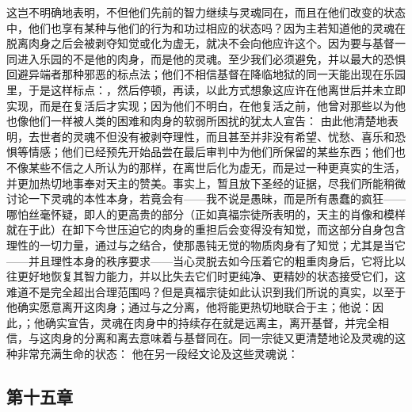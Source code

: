 这岂不明确地表明，不但他们先前的智力继续与灵魂同在，而且在他们改变的状态中，他们也享有某种与他们的行为和功过相应的状态吗？因为主若知道他的灵魂在脱离肉身之后会被剥夺知觉或化为虚无，就决不会向他应许这个。因为要与基督一同进入乐园的不是他的肉身，而是他的灵魂。至少我们必须避免，并以最大的恐惧回避异端者那种邪恶的标点法；他们不相信基督在降临地狱的同一天能出现在乐园里，于是这样标点：，然后停顿，再读，以此方式想象这应许在他离世后并未立即实现，而是在复活后才实现；因为他们不明白，在他复活之前，他曾对那些以为他也像他们一样被人类的困难和肉身的软弱所困扰的犹太人宣告：  由此他清楚地表明，去世者的灵魂不但没有被剥夺理性，而且甚至并非没有希望、忧愁、喜乐和恐惧等情感；他们已经预先开始品尝在最后审判中为他们所保留的某些东西；他们也不像某些不信之人所认为的那样，在离世后化为虚无，而是过一种更真实的生活，并更加热切地事奉对天主的赞美。事实上，暂且放下圣经的证据，尽我们所能稍微讨论一下灵魂的本性本身，若竟会有——我不说是愚昧，而是所有愚蠢的疯狂——哪怕丝毫怀疑，即人的更高贵的部分（正如真福宗徒所表明的，天主的肖像和模样就在于此）在卸下今世压迫它的肉身的重担后会变得没有知觉，而这部分自身包含理性的一切力量，通过与之结合，使那愚钝无觉的物质肉身有了知觉；尤其是当它——并且理性本身的秩序要求——当心灵脱去如今压着它的粗重肉身后，它将比以往更好地恢复其智力能力，并以比失去它们时更纯净、更精妙的状态接受它们，这难道不是完全超出合理范围吗？但是真福宗徒如此认识到我们所说的真实，以至于他确实愿意离开这肉身；通过与之分离，他将能更热切地联合于主；他说：因此，；他确实宣告，灵魂在肉身中的持续存在就是远离主，离开基督，并完全相信，与这肉身的分离和离去意味着与基督同在。同一宗徒又更清楚地论及灵魂的这种非常充满生命的状态：  他在另一段经文论及这些灵魂说：\par


\subsection{第十五章}

